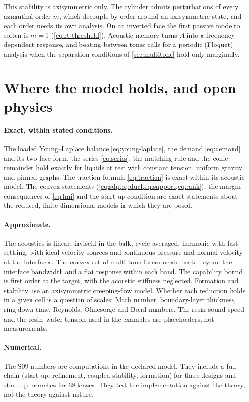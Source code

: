 \documentclass[11pt,a4paper]{article}
\numberwithin{equation}{section}
\begin{document}
This stability is axisymmetric only. The cylinder admits perturbations of every
azimuthal order $m$, which decouple by order around an axisymmetric state, and
each order needs its own analysis. On an inverted face the first passive mode to
soften is $m=1$ (\cref{eq:rt-threshold}). Acoustic memory turns $A$ into a
frequency-dependent response, and beating between tones calls for a periodic
(Floquet) analysis when the separation conditions of \cref{sec:multitone} hold
only marginally.

\section{Where the model holds, and open physics}\label{sec:validity}

\paragraph{Exact, within stated conditions.} The loaded Young--Laplace balance
\cref{eq:young-laplace}, the demand \cref{eq:demand} and its two-face form, the
series \cref{eq:series}, the matching rule and the conic remainder hold exactly
for liquids at rest with constant tension, uniform gravity and pinned graphs.
The traction formula \cref{eq:traction} is exact within its acoustic model. The
convex statements (\cref{eq:sdp,eq:dual,eq:support,eq:rank}), the margin
consequences of \cref{eq:lmi} and the start-up condition are exact statements
about the reduced, finite-dimensional models in which they are posed.

\paragraph{Approximate.} The acoustics is linear, inviscid in the bulk,
cycle-averaged, harmonic with fast settling, with ideal velocity sources and
continuous pressure and normal velocity at the interfaces. The convex set of
multi-tone forces needs beats beyond the interface bandwidth and a flat response
within each band. The capability bound is first order at the target, with the
acoustic stiffness neglected. Formation and stability use an axisymmetric
creeping-flow model. Whether each reduction holds in a given cell is a question
of scales: Mach number, boundary-layer thickness, ring-down time, Reynolds,
Ohnesorge and Bond numbers. The resin sound speed and the resin--water tension
used in the examples are placeholders, not measurements.

\paragraph{Numerical.} The S09 numbers are computations in the declared model.
They include a full chain (start-up, refinement, coupled stability, formation)
for three designs and start-up branches for 68 lenses. They test the
implementation against the theory, not the theory against nature.
\end{document}
